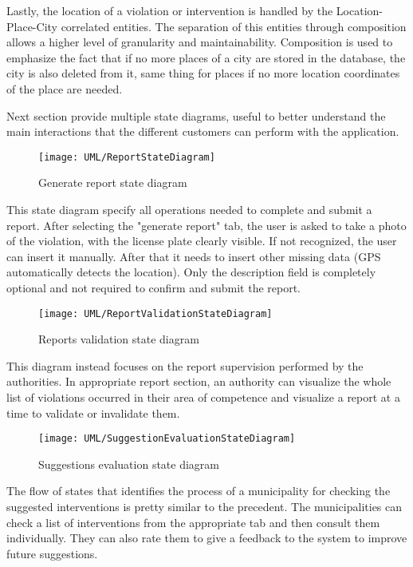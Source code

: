 Lastly, the location of a violation or intervention is handled by the Location-Place-City correlated entities. The separation of this entities through composition allows a higher level of granularity and maintainability. Composition is used to emphasize the fact that if no more places of a city are stored in the database, the city is also deleted from it, same thing for places if no more location coordinates of the place are needed.

Next section provide multiple state diagrams, useful to better understand the main interactions that the different customers can perform with the application.

\begin{figure}[H]
	\centering
	\texttt{[image: UML/ReportStateDiagram]}
	\caption{Generate report state diagram}
\end{figure}

This state diagram specify all operations needed to complete and submit a report. After selecting the "generate report" tab, the user is asked to take a photo of the violation, with the license plate clearly visible. If not recognized, the user can insert it manually. After that it needs to insert other missing data (GPS automatically detects the location). Only the description field is completely optional and not required to confirm and submit the report.

\begin{figure}[H]
	\centering
	\texttt{[image: UML/ReportValidationStateDiagram]}
	\caption{Reports validation state diagram}
\end{figure}

This diagram instead focuses on the report supervision performed by the authorities. In appropriate report section, an authority can visualize the whole list of violations occurred in their area of competence and visualize a report at a time to validate or invalidate them.

\begin{figure}[H]
	\centering
	\texttt{[image: UML/SuggestionEvaluationStateDiagram]}
	\caption{Suggestions evaluation state diagram}
\end{figure}

The flow of states that identifies the process of a municipality for checking the suggested interventions is pretty similar to the precedent. The municipalities can check a list of interventions from the appropriate tab and then consult them individually. They can also rate them to give a feedback to the system to improve future suggestions.

